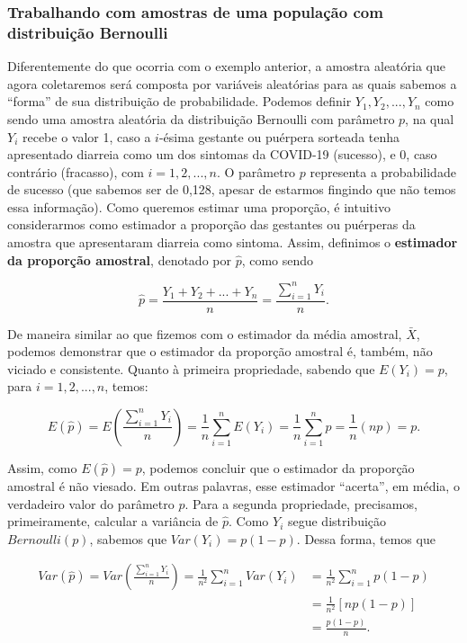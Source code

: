 \documentclass[
  letterpaper,
  DIV=11,
  numbers=noendperiod]{scrreprt}
\begin{document}
\hypertarget{trabalhando-com-amostras-de-uma-populauxe7uxe3o-com-distribuiuxe7uxe3o-bernoulli}{%
\subsubsection{Trabalhando com amostras de uma população com
distribuição
Bernoulli}\label{trabalhando-com-amostras-de-uma-populauxe7uxe3o-com-distribuiuxe7uxe3o-bernoulli}}

Diferentemente do que ocorria com o exemplo anterior, a amostra
aleatória que agora coletaremos será composta por variáveis aleatórias
para as quais sabemos a ``forma'' de sua distribuição de probabilidade.
Podemos definir \(Y_1, Y_2, ..., Y_{n}\) como sendo uma amostra
aleatória da distribuição Bernoulli com parâmetro \(p\), na qual \(Y_i\)
recebe o valor 1, caso a \(i\)-ésima gestante ou puérpera sorteada tenha
apresentado diarreia como um dos sintomas da COVID-19 (sucesso), e 0,
caso contrário (fracasso), com \(i = 1, 2, ..., n\). O parâmetro \(p\)
representa a probabilidade de sucesso (que sabemos ser de 0,128, apesar
de estarmos fingindo que não temos essa informação). Como queremos
estimar uma proporção, é intuitivo considerarmos como estimador a
proporção das gestantes ou puérperas da amostra que apresentaram
diarreia como sintoma. Assim, definimos o \textbf{estimador da proporção
amostral}, denotado por \(\hat{p}\), como sendo

\[
\hat{p} = \frac{Y_1 + Y_2 + ... + Y_n}{n} = \frac{\sum_{i = 1}^{n} Y_i}{n}.
\]

De maneira similar ao que fizemos com o estimador da média amostral,
\(\bar{X}\), podemos demonstrar que o estimador da proporção amostral é,
também, não viciado e consistente. Quanto à primeira propriedade,
sabendo que \(E(Y_i) = p\), para \(i = 1, 2, ..., n\), temos:

\[
E\left(\hat{p}\right) = E \left( \frac{\sum_{i = 1}^{n} Y_i}{n} \right) = \frac{1}{n} \sum_{i = 1}^{n} E\left(Y_i \right) =  \frac{1}{n}  \sum_{i = 1}^{n} p = \frac{1}{n} (np) = p.
\]

Assim, como \(E(\hat{p}) = p\), podemos concluir que o estimador da
proporção amostral é não viesado. Em outras palavras, esse estimador
``acerta'', em média, o verdadeiro valor do parâmetro \(p\). Para a
segunda propriedade, precisamos, primeiramente, calcular a variância de
\(\hat{p}\). Como \(Y_i\) segue distribuição \(Bernoulli(p)\), sabemos
que \(Var(Y_i) = p(1 - p)\). Dessa forma, temos que

\[
\begin{align}
Var(\hat{p}) = Var \left( \frac{\sum_{i = 1}^{n} Y_i}{n} \right) = \frac{1}{n^2} \sum_{i = 1}^{n} Var(Y_i) & = \frac{1}{n^2} \sum_{i = 1}^{n} p(1 - p) \\ &  = \frac{1}{n^2} \left[np(1 - p)\right] \\ &  = \frac{p(1 - p)}{n}.
\end{align}
\]
\end{document}
